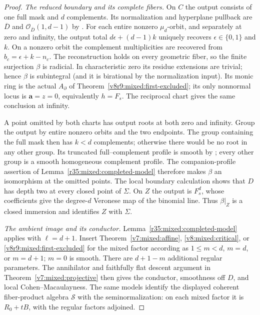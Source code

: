 \documentclass[10pt,fleqn]{article}
\numberwithin{equation}{section}
\begin{document}
\begin{proof}
\emph{The reduced boundary and its complete fibers.}
On $C$ the output consists of one full mask and $d$ complements.  Its
normalization and hyperplane pullback are $\overline D$ and
$\mathcal O_{\overline D}(1,d-1)$ by \cite[Theorem~5.4]{LiProfileGeometry}.
For each entire nonzero $\mu_d$-orbit, and separately at zero and
infinity, the output total $d\epsilon+(d-1)k$ uniquely recovers
$\epsilon\in\{0,1\}$ and $k$.  On a nonzero orbit the complement
multiplicities are recovered from $b_c=\epsilon+k-n_c$.
The reconstruction holds on every geometric fiber, so the finite surjection
$\beta$ is radicial.  In characteristic zero its residue extensions are
trivial; hence $\beta$ is subintegral (and it is birational by the
normalization input).  Its monic ring is the
actual $A_\partial$ of
Theorem~\ref{v8r9:mixed:first-excluded}; its only nonnormal locus is
$\mathbf a=z=0$, equivalently $h=F_s$.  The reciprocal chart gives the
same conclusion at infinity.

A point omitted by both charts has output roots at both zero and infinity.
Group the output by entire nonzero orbits and the two endpoints.  The group
containing the full mask then has $k<d$ complements; otherwise there would
be no root in any other group.  Its truncated full--complement profile is
smooth by \cite[Theorems~6.1--6.2]{LiProfileGeometry}; every other group is a smooth homogeneous
complement profile.  The companion-profile assertion of
Lemma~\ref{r35:mixed:completed-model} therefore makes $\beta$ an
isomorphism at the omitted points.  The local boundary calculation shows
that $D$ has depth two at every closed point of $\Sigma$.  On $Z$ the
output is $F_s^d$, whose coefficients give the degree-$d$ Veronese map of
the binomial line.  Thus $\beta|_Z$ is a closed immersion and identifies
$Z$ with $\Sigma$.

\emph{The ambient image and its conductor.}
Lemma~\ref{r35:mixed:completed-model} applies with $\ell=d+1$.
Insert Theorem~\ref{v7:mixed:affine}, \ref{v8:mixed:critical}, or
\ref{v8r9:mixed:first-excluded} for the mixed factor according as
$1\le m<d$, $m=d$, or $m=d+1$; $m=0$ is smooth.
There are $d+1-m$ additional regular parameters.  The annihilator and
faithfully flat descent argument in Theorem~\ref{v7:mixed:projective}
then gives the conductor, smoothness off $D$, and local
Cohen--Macaulayness.  The same models identify the displayed coherent
fiber-product algebra $\mathcal S$ with the seminormalization: on each
mixed factor it is $R_0+tB$, with the regular factors adjoined.


\end{proof}
\end{document}
